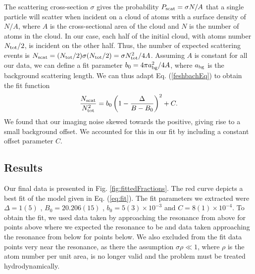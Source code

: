 \documentclass[12pt]{iopart}
\begin{document}
The scattering cross-section $\sigma$ gives the probability $P_{\rm{scat}}=\sigma N/A$ that a single particle will scatter when incident on a cloud of atoms with a surface density of $N/A$, where $A$ is the cross-sectional area of the cloud and $N$ is the number of atoms in the cloud. In our case, each half of the initial cloud, with atoms number $N_{\rm{tot}}/2$, is incident on the other half. Thus, the number of expected scattering events is $N_{\rm{scat}}= (N_{\rm{tot}}/2) \sigma  (N_{\rm{tot}}/2)=\sigma N_{\rm{tot}}^2/4A$. Assuming $A$ is constant for all our data, we can define a fit parameter $b_0=4\pi a_{\rm{bg}}^2/4A$, where $a_{\rm{bg}}$ is the background scattering length. We can thus adapt Eq. (\ref{feshbachEq}) to obtain the fit function
\begin{equation}
\frac{N_{\rm{scat}}}{N_{\rm{tot}}^2}=b_0\left(1-\frac{\Delta}{B-B_0}\right)^2 + C.
\label{eq:fit}
\end{equation}
We found that our imaging noise skewed towards the positive, giving rise to a small background offset. We accounted for this in our fit by including a constant offset parameter $C$.


\subsection{Results}
Our final data is presented in Fig. \ref{fig:fittedFractions}. The red curve depicts a best fit of the model given in Eq. (\ref{eq:fit}). The fit parameters we extracted were $\Delta = 1(5)$  \mT{}, $B_0 = 20.206(15)$  \mT{}, $b_0 = 5(3)\times 10^{-3}$ and $C=8(1)\times 10^{-4}$. To obtain the fit, we used data taken by approaching the resonance from above for points above where we expected the resonance to be and data taken approaching the resonance from below for points below. We also excluded from the fit data points very near the resonance, as there the assumption $\sigma\rho\ll1$, where $\rho$ is the atom number per unit area, is no longer valid and the problem must be treated hydrodynamically.
\end{document}
